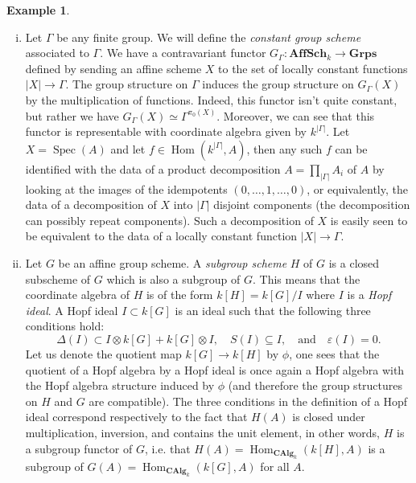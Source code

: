 \documentclass{article}
\theoremstyle{plain}
\theoremstyle{definition}
\newtheorem{Ex}[Th]{Example}
\DeclareMathOperator{\Hom}{Hom}
\DeclareMathOperator{\Spec}{Spec}
\begin{document}
\begin{Ex}
\begin{enumerate}[(i)]
    \item Let $\Gamma$ be any finite group. We will define the \textit{constant group scheme} associated to $\Gamma$. We have a contravariant functor $G_\Gamma\colon \textbf{AffSch}_k \to \textbf{Grps}$ defined by sending an affine scheme $X$ to the set of locally constant functions $|X|\to \Gamma$. The group structure on $\Gamma$ induces the group structure on $G_\Gamma(X)$ by the multiplication of functions. Indeed, this functor isn't quite constant, but rather we have $G_\Gamma(X)\simeq \Gamma^{\pi_0(X)}$. Moreover, we can see that this functor is representable with coordinate algebra given by $k^{|\Gamma|}$. Let $X=\Spec(A)$ and let $f\in \Hom(k^{|\Gamma|}, A)$, then any such $f$ can be identified with the data of a product decomposition $A=\prod_{|\Gamma|}A_i$ of $A$ by looking at the images of the idempotents $(0, \dots, 1, \dots, 0)$, or equivalently, the data of a decomposition of $X$ into $|\Gamma |$ disjoint components (the decomposition can possibly repeat components). Such a decomposition of $X$ is easily seen to be equivalent to the data of a locally constant function $|X|\to \Gamma$.
    \item Let $G$ be an affine group scheme. A \textit{subgroup scheme} $H$ of $G$ is a closed subscheme of $G$ which is also a subgroup of $G$. This means that the coordinate algebra of $H$ is of the form $k[H]=k[G]/I$ where $I$ is a \textit{Hopf ideal}. A Hopf ideal $I\subset k[G]$ is an ideal such that the following three conditions hold: 
    \[
    \Delta(I)\subset I\otimes k[G] + k[G]\otimes I, \quad S(I)\subseteq I, \quad \mbox{and} \quad \varepsilon(I)=0.
    \]
    Let us denote the quotient map $k[G]\to k[H]$ by $\phi$, one sees that the quotient of a Hopf algebra by a Hopf ideal is once again a Hopf algebra with the Hopf algebra structure induced by $\phi$ (and therefore the group structures on $H$ and $G$ are compatible). The three conditions in the definition of a Hopf ideal correspond respectively to the fact that $H(A)$ is closed under multiplication, inversion, and contains the unit element, in other words, $H$ is a subgroup functor of $G$, i.e. that $H(A)=\Hom_{\textbf{CAlg}_k}(k[H], A)$ is a subgroup of $G(A)=\Hom_{\textbf{CAlg}_k}(k[G], A)$ for all $A$. 
    

\end{enumerate}
\end{Ex}
\end{document}

